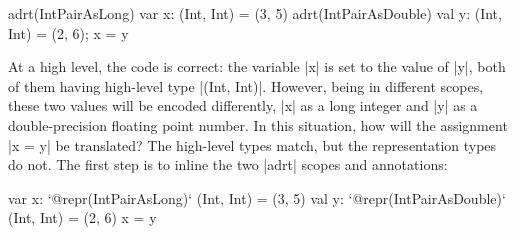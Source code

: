 




\begin{lstlisting-nobreak}
adrt(IntPairAsLong)   { var x: (Int, Int) = (3, 5) }
adrt(IntPairAsDouble) { val y: (Int, Int) = (2, 6); x = y }
\end{lstlisting-nobreak}

At a high level, the code is correct: the variable |x| is set to the value of |y|, both of them having high-level type |(Int, Int)|. However, being in different scopes, these two values will be encoded differently, |x| as a long integer and |y| as a double-precision floating point number. In this situation, how will the assignment |x = y| be translated? The high-level types match, but the representation types do not. The first step is to inline the two |adrt| scopes and \inject{} annotations:

\begin{lstlisting-nobreak}
var x: `@repr(IntPairAsLong)` (Int, Int) = (3, 5)
val y: `@repr(IntPairAsDouble)` (Int, Int) = (2, 6)
x = y
\end{lstlisting-nobreak}

